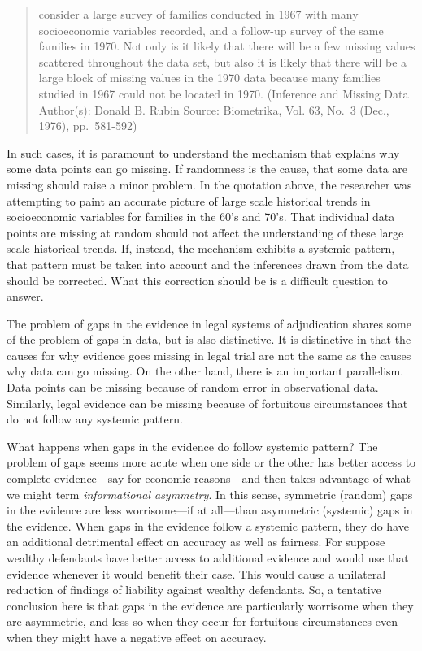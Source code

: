 \documentclass[
  10pt,
  dvipsnames,enabledeprecatedfontcommands]{scrartcl}
\begin{document}
\begin{quote}
consider a large survey of families conducted in 1967 with many
socioeconomic variables recorded, and a follow-up survey of the same
families in 1970. Not only is it likely that there will be a few missing
values scattered throughout the data set, but also it is likely that
there will be a large block of missing values in the 1970 data because
many families studied in 1967 could not be located in 1970. (Inference
and Missing Data Author(s): Donald B. Rubin Source: Biometrika, Vol. 63,
No.~3 (Dec., 1976), pp.~581-592)
\end{quote}

In such cases, it is paramount to understand the mechanism that explains
why some data points can go missing. If randomness is the cause, that
some data are missing should raise a minor problem. In the quotation
above, the researcher was attempting to paint an accurate picture of
large scale historical trends in socioeconomic variables for families in
the 60's and 70's. That individual data points are missing at random
should not affect the understanding of these large scale historical
trends. If, instead, the mechanism exhibits a systemic pattern, that
pattern must be taken into account and the inferences drawn from the
data should be corrected. What this correction should be is a difficult
question to answer.

The problem of gaps in the evidence in legal systems of adjudication
shares some of the problem of gaps in data, but is also distinctive. It
is distinctive in that the causes for why evidence goes missing in legal
trial are not the same as the causes why data can go missing. On the
other hand, there is an important parallelism. Data points can be
missing because of random error in observational data. Similarly, legal
evidence can be missing because of fortuitous circumstances that do not
follow any systemic pattern.

What happens when gaps in the evidence do follow systemic pattern? The
problem of gaps seems more acute when one side or the other has better
access to complete evidence---say for economic reasons---and then takes
advantage of what we might term \textit{informational asymmetry}. In
this sense, symmetric (random) gaps in the evidence are less
worrisome---if at all---than asymmetric (systemic) gaps in the evidence.
When gaps in the evidence follow a systemic pattern, they do have an
additional detrimental effect on accuracy as well as fairness. For
suppose wealthy defendants have better access to additional evidence and
would use that evidence whenever it would benefit their case. This would
cause a unilateral reduction of findings of liability against wealthy
defendants. So, a tentative conclusion here is that gaps in the evidence
are particularly worrisome when they are asymmetric, and less so when
they occur for fortuitous circumstances even when they might have a
negative effect on accuracy.
\end{document}
